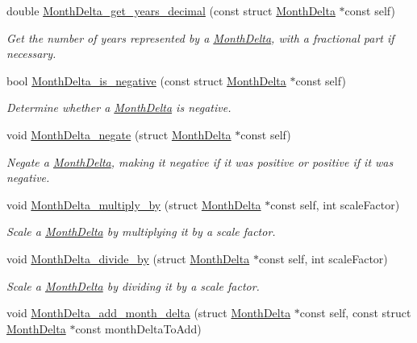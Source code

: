 \begin{DoxyCompactItemize}
double \hyperlink{month-delta_8h_afa5436ebc73fc5ce02c99f86a05d377c}{\-Month\-Delta\-\_\-get\-\_\-years\-\_\-decimal} (const struct \hyperlink{structMonthDelta}{\-Month\-Delta} $\ast$const self)
\begin{DoxyCompactList}\small\item\em \-Get the number of years represented by a \hyperlink{structMonthDelta}{\-Month\-Delta}, with a fractional part if necessary. \end{DoxyCompactList}\item 
bool \hyperlink{month-delta_8h_a03c4b1b8f6edca4c798b469e3f03bdfa}{\-Month\-Delta\-\_\-is\-\_\-negative} (const struct \hyperlink{structMonthDelta}{\-Month\-Delta} $\ast$const self)
\begin{DoxyCompactList}\small\item\em \-Determine whether a \hyperlink{structMonthDelta}{\-Month\-Delta} is negative. \end{DoxyCompactList}\item 
void \hyperlink{month-delta_8h_a4d77c910d4ec5841e5e3f59d63490078}{\-Month\-Delta\-\_\-negate} (struct \hyperlink{structMonthDelta}{\-Month\-Delta} $\ast$const self)
\begin{DoxyCompactList}\small\item\em \-Negate a \hyperlink{structMonthDelta}{\-Month\-Delta}, making it negative if it was positive or positive if it was negative. \end{DoxyCompactList}\item 
void \hyperlink{month-delta_8h_a147987d17fd1c580240979fde395b723}{\-Month\-Delta\-\_\-multiply\-\_\-by} (struct \hyperlink{structMonthDelta}{\-Month\-Delta} $\ast$const self, int scale\-Factor)
\begin{DoxyCompactList}\small\item\em \-Scale a \hyperlink{structMonthDelta}{\-Month\-Delta} by multiplying it by a scale factor. \end{DoxyCompactList}\item 
void \hyperlink{month-delta_8h_acd94c6f51a37b55c6e6b6ebd5a39cf7e}{\-Month\-Delta\-\_\-divide\-\_\-by} (struct \hyperlink{structMonthDelta}{\-Month\-Delta} $\ast$const self, int scale\-Factor)
\begin{DoxyCompactList}\small\item\em \-Scale a \hyperlink{structMonthDelta}{\-Month\-Delta} by dividing it by a scale factor. \end{DoxyCompactList}\item 
void \hyperlink{month-delta_8h_a9f725b1f782ab8ddd1aa734d2cdbce27}{\-Month\-Delta\-\_\-add\-\_\-month\-\_\-delta} (struct \hyperlink{structMonthDelta}{\-Month\-Delta} $\ast$const self, const struct \hyperlink{structMonthDelta}{\-Month\-Delta} $\ast$const month\-Delta\-To\-Add)

\end{DoxyCompactItemize}
